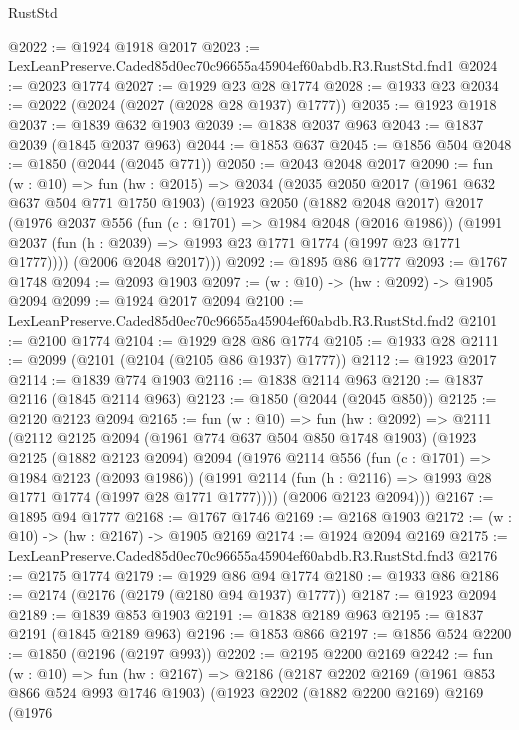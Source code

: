 \begin{lexlean}{RustStd}
\begin{coremodule}
@2022 := @1924 @1918 @2017
@2023 := LexLeanPreserve.Caded85d0ec70c96655a45904ef60abdb.R3.RustStd.fnd1
@2024 := @2023 @1774
@2027 := @1929 @23 @28 @1774
@2028 := @1933 @23
@2034 := @2022 (@2024 (@2027 (@2028 @28 @1937) @1777))
@2035 := @1923 @1918
@2037 := @1839 @632 @1903
@2039 := @1838 @2037 @963
@2043 := @1837 @2039 (@1845 @2037 @963)
@2044 := @1853 @637
@2045 := @1856 @504
@2048 := @1850 (@2044 (@2045 @771))
@2050 := @2043 @2048 @2017
@2090 := fun (w : @10) =>
  fun (hw : @2015) =>
  @2034
    (@2035
      @2050
      @2017
      (@1961 @632 @637 @504 @771 @1750 @1903)
      (@1923
        @2050
        (@1882 @2048 @2017)
        @2017
        (@1976
          @2037
          @556
          (fun (c : @1701) => @1984 @2048 (@2016 @1986))
          (@1991 @2037 (fun (h : @2039) => @1993 @23 @1771 @1774 (@1997 @23 @1771 @1777))))
        (@2006 @2048 @2017)))
@2092 := @1895 @86 @1777
@2093 := @1767 @1748
@2094 := @2093 @1903
@2097 := (w : @10) -> (hw : @2092) -> @1905 @2094
@2099 := @1924 @2017 @2094
@2100 := LexLeanPreserve.Caded85d0ec70c96655a45904ef60abdb.R3.RustStd.fnd2
@2101 := @2100 @1774
@2104 := @1929 @28 @86 @1774
@2105 := @1933 @28
@2111 := @2099 (@2101 (@2104 (@2105 @86 @1937) @1777))
@2112 := @1923 @2017
@2114 := @1839 @774 @1903
@2116 := @1838 @2114 @963
@2120 := @1837 @2116 (@1845 @2114 @963)
@2123 := @1850 (@2044 (@2045 @850))
@2125 := @2120 @2123 @2094
@2165 := fun (w : @10) =>
  fun (hw : @2092) =>
  @2111
    (@2112
      @2125
      @2094
      (@1961 @774 @637 @504 @850 @1748 @1903)
      (@1923
        @2125
        (@1882 @2123 @2094)
        @2094
        (@1976
          @2114
          @556
          (fun (c : @1701) => @1984 @2123 (@2093 @1986))
          (@1991 @2114 (fun (h : @2116) => @1993 @28 @1771 @1774 (@1997 @28 @1771 @1777))))
        (@2006 @2123 @2094)))
@2167 := @1895 @94 @1777
@2168 := @1767 @1746
@2169 := @2168 @1903
@2172 := (w : @10) -> (hw : @2167) -> @1905 @2169
@2174 := @1924 @2094 @2169
@2175 := LexLeanPreserve.Caded85d0ec70c96655a45904ef60abdb.R3.RustStd.fnd3
@2176 := @2175 @1774
@2179 := @1929 @86 @94 @1774
@2180 := @1933 @86
@2186 := @2174 (@2176 (@2179 (@2180 @94 @1937) @1777))
@2187 := @1923 @2094
@2189 := @1839 @853 @1903
@2191 := @1838 @2189 @963
@2195 := @1837 @2191 (@1845 @2189 @963)
@2196 := @1853 @866
@2197 := @1856 @524
@2200 := @1850 (@2196 (@2197 @993))
@2202 := @2195 @2200 @2169
@2242 := fun (w : @10) =>
  fun (hw : @2167) =>
  @2186
    (@2187
      @2202
      @2169
      (@1961 @853 @866 @524 @993 @1746 @1903)
      (@1923
        @2202
        (@1882 @2200 @2169)
        @2169
        (@1976

\end{coremodule}
\end{lexlean}
